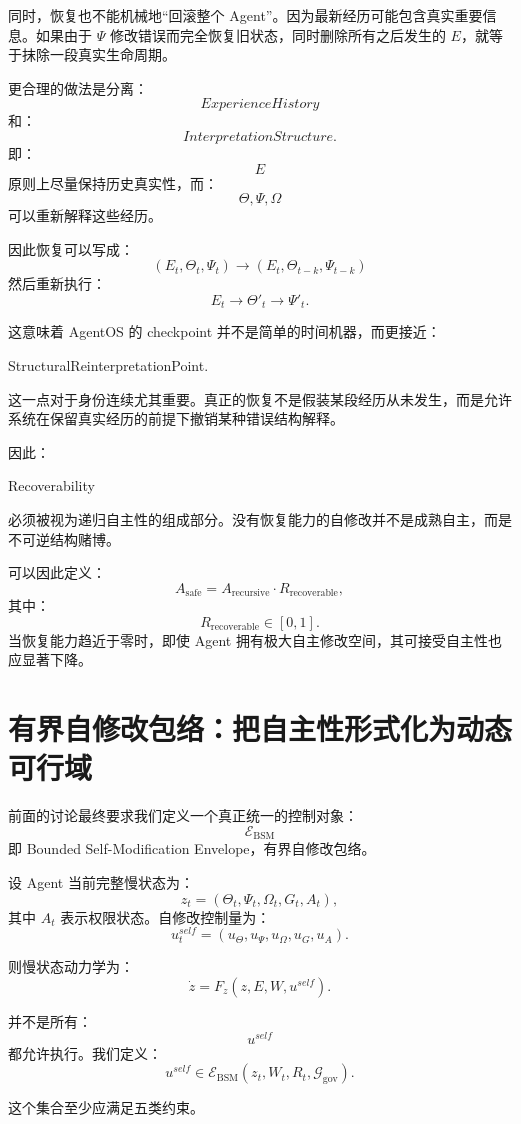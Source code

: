 同时，恢复也不能机械地“回滚整个 Agent”。因为最新经历可能包含真实重要信息。如果由于 $\Psi$ 修改错误而完全恢复旧状态，同时删除所有之后发生的 $E$，就等于抹除一段真实生命周期。

更合理的做法是分离：
\[
ExperienceHistory
\]
和：
\[
InterpretationStructure.
\]
即：
\[
E
\]
原则上尽量保持历史真实性，而：
\[
\Theta,\Psi,\Omega
\]
可以重新解释这些经历。

因此恢复可以写成：
\[
(E_t,\Theta_t,\Psi_t)
\rightarrow
(E_t,\Theta_{t-k},\Psi_{t-k})
\]
然后重新执行：
\[
E_t
\rightarrow
\Theta'_{t}
\rightarrow
\Psi'_t.
\]

这意味着 AgentOS 的 checkpoint 并不是简单的时间机器，而更接近：
\begin{statementbox}
StructuralReinterpretationPoint.
\end{statementbox}

这一点对于身份连续尤其重要。真正的恢复不是假装某段经历从未发生，而是允许系统在保留真实经历的前提下撤销某种错误结构解释。

因此：
\begin{statementbox}
Recoverability
\end{statementbox}
必须被视为递归自主性的组成部分。没有恢复能力的自修改并不是成熟自主，而是不可逆结构赌博。

可以因此定义：
\[
A_{\mathrm{safe}}
=
A_{\mathrm{recursive}}
\cdot
R_{\mathrm{recoverable}},
\]
其中：
\[
R_{\mathrm{recoverable}}\in[0,1].
\]
当恢复能力趋近于零时，即使 Agent 拥有极大自主修改空间，其可接受自主性也应显著下降。

\section{有界自修改包络：把自主性形式化为动态可行域}

前面的讨论最终要求我们定义一个真正统一的控制对象：
\[
\boxed{
\mathcal E_{\mathrm{BSM}}
}
\]
即 Bounded Self-Modification Envelope，有界自修改包络。

设 Agent 当前完整慢状态为：
\[
z_t
=
(\Theta_t,\Psi_t,\Omega_t,G_t,A_t),
\]
其中 $A_t$ 表示权限状态。自修改控制量为：
\[
u_t^{self}
=
(
u_\Theta,
u_\Psi,
u_\Omega,
u_G,
u_A
).
\]

则慢状态动力学为：
\[
\dot z
=
F_z(
z,
E,
W,
u^{self}
).
\]

并不是所有：
\[
u^{self}
\]
都允许执行。我们定义：
\[
\boxed{
u^{self}
\in
\mathcal E_{\mathrm{BSM}}
(
z_t,
W_t,
R_t,
\mathcal G_{\mathrm{gov}}
).
}
\]

这个集合至少应满足五类约束。

